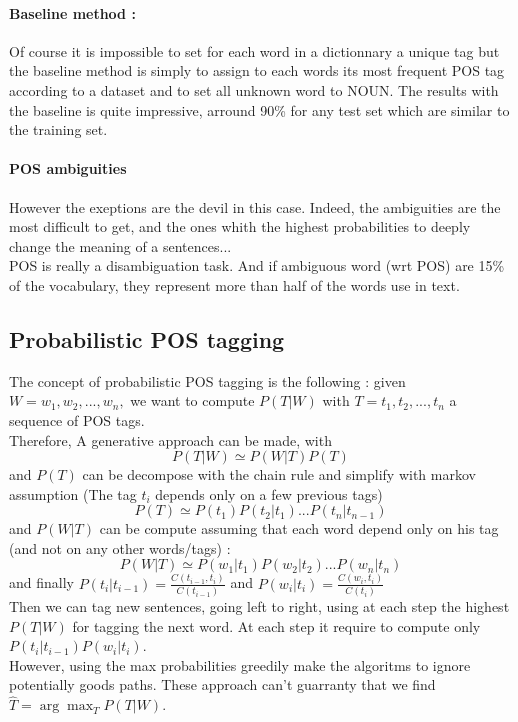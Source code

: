 			\paragraph*{Baseline method :}
				Of course it is impossible to set for each word in a dictionnary a unique tag but the baseline method is simply to assign to each words its most frequent POS tag according to a dataset and to set all unknown word to NOUN. The results with the baseline is quite impressive, arround 90\% for any test set which are similar to the training set.

			\paragraph*{POS ambiguities}
				However the exeptions are the devil in this case. Indeed, the ambiguities are the most difficult to get, and the ones whith the highest probabilities to deeply change the meaning of a sentences...\\
				POS is really a disambiguation task. And if ambiguous word (wrt POS) are 15\% of the vocabulary, they represent more than half of the words use in text. 



		\subsection{Probabilistic POS tagging}

			The concept of probabilistic POS tagging is the following : given $W = w_1,w_2,...,w_n,$ we want to compute $P(T|W)$ with $T = t_1, t_2, ..., t_n$ a sequence of POS tags.\\
			Therefore, A generative approach can be made, with
			 \[P(T | W) \simeq P(W|T) P(T)\] 
			 and $P(T)$ can be decompose with the chain rule and simplify with markov assumption (The tag $t_i$ depends only on a few previous tags) 
			\[P(T) \simeq P(t_1)P(t_2 | t_1)...P(t_n | t_{n-1})\] 
			and $P(W |T)$ can be compute assuming that each word depend only on his tag (and not on any other words/tags) : 
			\[P(W|T) \simeq P(w_1 |t_1)P(w_2 |t_2)...P(w_n |t_n)\]
			and finally $P(t_i | t_{i-1}) = \frac{C(t_{i-1}, t_i)}{C(t_{i-1})}$ and $P(w_i | t_{i} )= \frac{C(w_{i}, t_i)}{C(t_{i})}$\\
			Then we can tag new sentences, going left to right, using at each step the highest $P(T | W)$ for tagging the next word. At each step it require to compute only $P(t_i | t_{i-1})P(w_i |t_i)$.\\
			However, using the max probabilities greedily make the algoritms to ignore potentially goods paths. These approach can't guarranty that we find $\hat{T} = \arg\max_T P(T |W)$.

